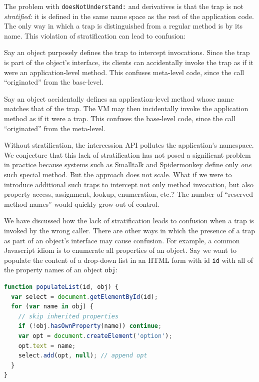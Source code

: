 \documentclass{sig-alternate}
\begin{document}
The problem with \texttt{doesNotUnderstand:} and derivatives is that the trap is not \emph{stratified}: it is defined in the same name space as the rest of the application code. The only way in which a trap is distinguished from a regular method is by its name. This violation of stratification can lead to confusion:

\begin{itemize*}
  \item Say an object purposely defines the trap to intercept invocations. Since the trap is part of the object's interface, its clients can accidentally invoke the trap as if it were an application-level method. This confuses meta-level code, since the call ``originated'' from the base-level.
  \item Say an object accidentally defines an application-level method whose name matches that of the trap. The VM may then incidentally invoke the application method as if it were a trap. This confuses the base-level code, since the call ``originated'' from the meta-level.
\end{itemize*}

Without stratification, the intercession API pollutes the application's namespace.
We conjecture that this lack of stratification has not posed a significant problem in practice because systems such as Smalltalk and Spidermonkey define only \emph{one} such special method. But the approach does not scale. What if we were to introduce additional such traps to intercept not only method invocation, but also property access, assignment, lookup, enumeration, etc.? The number of ``reserved method names'' would quickly grow out of control.

We have discussed how the lack of stratification leads to confusion when a trap is invoked by the wrong caller. There are other ways in which the presence of a trap as part of an object's interface may cause confusion. For example, a common Javascript idiom is to enumerate all properties of an object. Say we want to populate the content of a drop-down list in an HTML form with id \texttt{id} with all of the property names of an object \texttt{obj}:

\begin{lstlisting}[language=javascript]
function populateList(id, obj) {
  var select = document.getElementById(id);
  for (var name in obj) {
    // skip inherited properties
    if (!obj.hasOwnProperty(name)) continue;
    var opt = document.createElement('option');
    opt.text = name;
    select.add(opt, null); // append opt
  }
}
\end{lstlisting}
\end{document}
